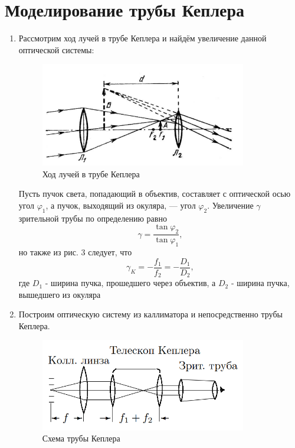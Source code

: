 \documentclass[a4paper,12pt]{article} %
\begin{document}
\section*{Моделирование трубы Кеплера}
\begin{enumerate}
    \item Рассмотрим ход лучей в трубе Кеплера и найдём увеличение данной оптической системы:
    
    \begin{figure}[h]
    \centering
    \includegraphics[width=9cm]{kepler.PNG}
    \caption{Ход лучей в трубе Кеплера}
    \label{fig:vac}
\end{figure}

Пусть пучок света, попадающий в объектив, составляет с оптической осью угол $\varphi_1$, а пучок, выходящий из окуляра, — угол $\varphi_2$. Увеличение $\gamma$ зрительной трубы по определению равно
\begin{equation}
    \gamma = \frac{\tan \varphi_2}{\tan \varphi_1},
\end{equation}
но также из рис. 3 следует, что 
\begin{equation}
    \gamma_K = -\frac{f_1}{f_2} = -\frac{D_1}{D_2},
\end{equation}
где $D_1$ - ширина пучка, прошедшего через объектив, а $D_2$ - ширина пучка, вышедшего из окуляра

\item Построим оптическую систему из каллиматора и непосредственно трубы Кеплера. 

    \begin{figure}[h]
    \centering
    \includegraphics[width=9cm]{kepler_2.PNG}
    \caption{Схема трубы Кеплера}
    \label{fig:vac}
\end{figure}


\end{enumerate}
\end{document}
